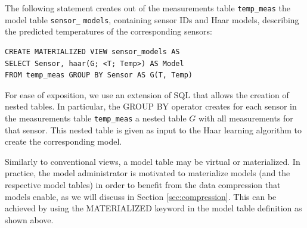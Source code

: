 \begin{example}
\label{xmpl:models-and-definitions}
%
The following statement creates out of the measurements table \texttt{temp\_meas} the model table \texttt{sensor\_} \texttt{models}, containing sensor IDs and Haar models, describing the predicted temperatures of the corresponding sensors:

\begin{verbatim}
CREATE MATERIALIZED VIEW sensor_models AS 
SELECT Sensor, haar(G; <T; Temp>) AS Model
FROM temp_meas GROUP BY Sensor AS G(T, Temp)
\end{verbatim}

For ease of exposition, we use an extension of SQL that allows the creation of nested tables. In particular, the GROUP BY operator creates for each sensor in the measurements table \texttt{temp\_meas} a nested table $G$ with all measurements for that sensor. This nested table is given as input to the Haar learning algorithm to create the corresponding model.
\end{example}

Similarly to conventional views, a model table may be virtual or materialized. In practice, the model administrator is motivated to materialize models (and the respective model tables) in order to benefit from the data compression that models enable, as we will discuss in Section \ref{sec:compression}. This can be achieved by using the MATERIALIZED keyword in the model table definition as shown above.\\



